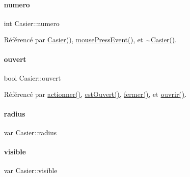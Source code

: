 \paragraph{\texorpdfstring{numero}{numero}}
{\footnotesize\ttfamily int Casier\+::numero\hspace{0.3cm}{\ttfamily [private]}}



Référencé par \hyperlink{class_casier_a27c0b818ceacb180d031f24d57033d62}{Casier()}, \hyperlink{class_casier_ad12cf89b6a99254f529997003adcf029}{mouse\+Press\+Event()}, et \hyperlink{class_casier_a4aebc2219ccd4612cf79413904bb9340}{$\sim$\+Casier()}.

\mbox{\label{class_casier_afe544ed1a87ce714a9fbbe16126669e4}} 
\paragraph{\texorpdfstring{ouvert}{ouvert}}
{\footnotesize\ttfamily bool Casier\+::ouvert\hspace{0.3cm}{\ttfamily [private]}}



Référencé par \hyperlink{class_casier_a9182fdde9d86e8f67e4d96ca3dad5eaa}{actionner()}, \hyperlink{class_casier_ab26fd4da845423355835da8d445ed5dd}{est\+Ouvert()}, \hyperlink{class_casier_a4a6051d72548b83d4b2dfaf189ae6c72}{fermer()}, et \hyperlink{class_casier_ac4b0de3ba58dc2bab52b049b278f4f90}{ouvrir()}.

\mbox{\label{class_casier_a5632690d442ab8599f15bb38cefd88f7}} 
\paragraph{\texorpdfstring{radius}{radius}}
{\footnotesize\ttfamily var Casier\+::radius\hspace{0.3cm}{\ttfamily [private]}}

\mbox{\label{class_casier_af0235cfd5b758941075fe3c9ce33f9a6}} 
\paragraph{\texorpdfstring{visible}{visible}}
{\footnotesize\ttfamily var Casier\+::visible\hspace{0.3cm}{\ttfamily [private]}}

